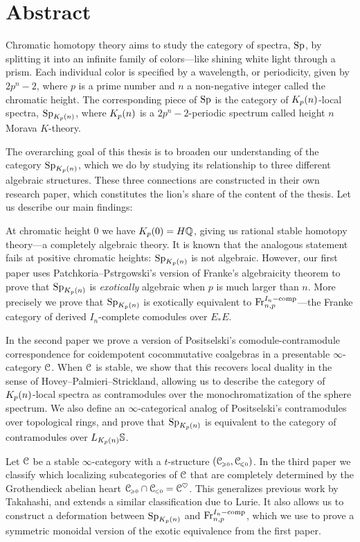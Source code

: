 

\section*{Abstract}

Chromatic homotopy theory aims to study the category of spectra, $\mathrm{Sp}$, by splitting it into an infinite family of colors---like shining white light through a prism. Each individual color is specified by a wavelength, or periodicity, given by $2p^n-2$, where $p$ is a prime number and $n$ a non-negative integer called the chromatic height. The corresponding piece of $\mathrm{Sp}$ is the category of ${K_p(n)}$-local spectra, $\mathrm{Sp}_{K_p(n)}$, where ${K_p(n)}$ is a $2p^n-2$-periodic spectrum called height $n$ Morava $K$-theory. 

The overarching goal of this thesis is to broaden our understanding of the category $\mathrm{Sp}_{K_p(n)}$, which we do by studying its relationship to three different algebraic structures. These three connections are constructed in their own research paper, which constitutes the lion's share of the content of the thesis. Let us describe our main findings:

At chromatic height $0$ we have $K_p(0) = H\mathbb{Q}$, giving us rational stable homotopy theory---a completely algebraic theory. It is known that the analogous statement fails at positive chromatic heights: $\mathrm{Sp}_{K_p(n)}$ is not algebraic. However, our first paper uses Patchkoria--Pstr\a{}gowski's version of Franke's algebraicity theorem to prove that $\mathrm{Sp}_{K_p(n)}$ is \emph{exotically} algebraic when $p$ is much larger than $n$. More precisely we prove that $\mathrm{Sp}_{K_p(n)}$ is exotically equivalent to $\mathrm{Fr}_{n,p}^{I_n-\mathrm{comp}}$---the Franke category of derived $I_n$-complete comodules over $E_*E$. 

In the second paper we prove a version of Positselski's comodule-contramodule correspondence for coidempotent cocommutative coalgebras in a presentable $\infty$-category $\EuScript{C}$. When $\EuScript{C}$ is stable, we show that this recovers local duality in the sense of Hovey--Palmieri--Strickland, allowing us to describe the category of ${K_p(n)}$-local spectra as contramodules over the monochromatization of the sphere spectrum. We also define an $\infty$-categorical analog of Positselski's contramodules over topological rings, and prove that $\mathrm{Sp}_{K_p(n)}$ is equivalent to the category of contramodules over $L_{K_p(n)} \mathbb{S}$. 

Let $\EuScript{C}$ be a stable $\infty$-category with a $t$-structure $(\EuScript{C}_{\hspace{-1pt}\scriptscriptstyle\geqslant 0}, \EuScript{C}_{\hspace{-1pt}\scriptscriptstyle\leqslant 0})$. In the third paper we classify which localizing subcategories of $\EuScript{C}$ that are completely determined by the Grothendieck abelian heart $\EuScript{C}_{\hspace{-1pt}\scriptscriptstyle\geqslant 0} \cap \EuScript{C}_{\hspace{-1pt}\scriptscriptstyle\leqslant 0} = \EuScript{C}^\heartsuit$. This generalizes previous work by Takahashi, and extends a similar classification due to Lurie. It also allows us to construct a deformation between $\mathrm{Sp}_{K_p(n)}$ and $\mathrm{Fr}_{n,p}^{I_n-\mathrm{comp}}$, which we use to prove a symmetric monoidal version of the exotic equivalence from the first paper. 




